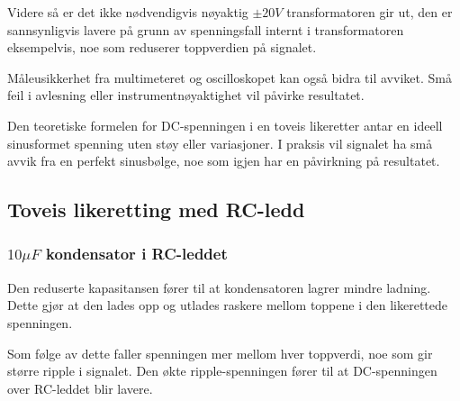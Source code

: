         Videre så er det ikke nødvendigvis nøyaktig $\pm 20V$ transformatoren gir ut, den er sannsynligvis lavere på grunn av spenningsfall internt i transformatoren eksempelvis, noe som reduserer toppverdien på signalet.

        Måleusikkerhet fra multimeteret og oscilloskopet kan også bidra til avviket. Små feil i avlesning eller instrumentnøyaktighet vil påvirke resultatet.

        Den teoretiske formelen for DC-spenningen i en toveis likeretter antar en ideell sinusformet spenning uten støy eller variasjoner. I praksis vil signalet ha små avvik fra en perfekt sinusbølge, noe som igjen har en påvirkning på resultatet.

    \subsection{Toveis likeretting med RC-ledd}
        \subsubsection{$10\mu F$ kondensator i RC-leddet}
            Den reduserte kapasitansen fører til at kondensatoren lagrer mindre ladning. Dette gjør at den lades opp og utlades raskere mellom toppene i den likerettede spenningen.

            Som følge av dette faller spenningen mer mellom hver toppverdi, noe som gir større ripple i signalet. Den økte ripple-spenningen fører til at DC-spenningen over RC-leddet blir lavere.
